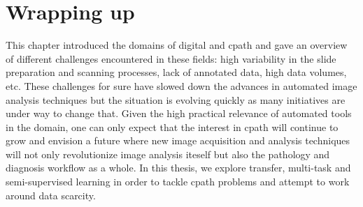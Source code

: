 \section{Wrapping up}

This chapter introduced the domains of digital and \acrlong{cpath} and gave an overview of different challenges encountered in these fields: high variability in the slide preparation and scanning processes, lack of annotated data, high data volumes, etc. These challenges for sure have slowed down the advances in automated image analysis techniques but the situation is evolving quickly as many initiatives are under way to change that. Given the high practical relevance of automated tools in the domain, one can only expect that the interest in \acrlong{cpath} will continue to grow and envision a future where new image acquisition and analysis techniques will not only revolutionize image analysis iteself but also the pathology and diagnosis workflow as a whole. In this thesis, we explore transfer, multi-task and semi-supervised learning in order to tackle \acrlong{cpath} problems and attempt to work around data scarcity.